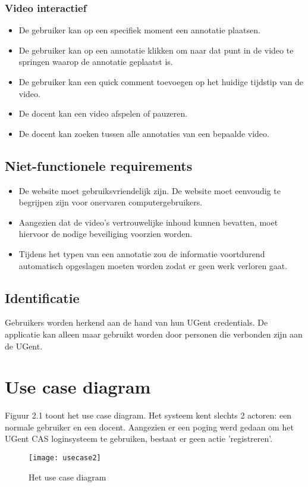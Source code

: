 \subsubsection{Video interactief}
\begin{itemize}
	\item De gebruiker kan op een specifiek moment een annotatie plaatsen.
	\item De gebruiker kan op een annotatie klikken om naar dat punt in de video te springen waarop de annotatie geplaatst is.
	\item De gebruiker kan een quick comment toevoegen op het huidige tijdstip van de video.
	\item De docent kan een video afspelen of pauzeren.
	\item De docent kan zoeken tussen alle annotaties van een bepaalde video.
\end{itemize}
\subsection{Niet-functionele requirements}
\begin{itemize}
 \item De website moet gebruiksvriendelijk zijn. De website moet eenvoudig te begrijpen zijn voor onervaren computergebruikers.
 \item Aangezien dat de video's vertrouwelijke inhoud kunnen bevatten, moet hiervoor de nodige beveiliging voorzien worden.
 \item Tijdens het typen van een annotatie zou de informatie voortdurend automatisch opgeslagen moeten worden zodat er geen werk verloren gaat. 
\end{itemize}

\subsection{Identificatie}
Gebruikers worden herkend aan de hand van hun UGent credentials. De applicatie kan alleen maar gebruikt worden door personen die verbonden zijn aan de UGent.

\section{Use case diagram}
Figuur 2.1 toont het use case diagram. Het systeem kent slechts 2 actoren: een normale gebruiker en een docent. Aangezien er een poging werd gedaan om het UGent CAS loginsysteem te gebruiken, bestaat er geen actie 'registreren'.
\begin{figure}
    \centering
        \texttt{[image: usecase2]}
    \caption{Het use case diagram}
\end{figure}
\pagebreak
